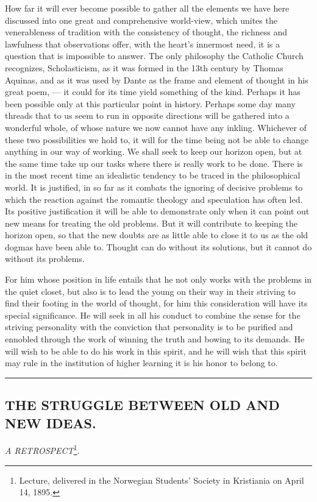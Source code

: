 \documentclass[12pt,a4paper,openany]{book}
\newcommand{\opage}[1]{\marginnote{\footnotesize\textit{[#1]}}}
\newcommand{\essay}[2][]{\chapter*{#2}\addcontentsline{toc}{chapter}{#1}}
\newcommand{\streg}{\begin{center}\rule{3em}{0.4pt}\end{center}}
\begin{document}
How far it will ever become possible to gather all
the elements we have here discussed into one great and comprehensive
world-view, which unites the venerableness of tradition
with the consistency of thought, the richness and lawfulness
that observations offer, with the heart's innermost need, it is
a question that is impossible to answer. The only
philosophy the Catholic Church recognizes, Scholasticism, as it
was formed in the 13th century by Thomas Aquinas, and as it
was used by Dante as the frame and element of thought in his
great poem, --- it could for its time yield something of the kind.
Perhaps it has been possible only at this particular point
in history. Perhaps some day many threads that to us
seem to run in opposite directions will be gathered into a wonderful whole,
of whose nature we now cannot have any inkling. Whichever
of these two possibilities we hold to, it will for the time being
not be able to change anything in our way of working. We shall seek to
keep our horizon open, but at the same time take up our tasks
where there is really work to be done. There is in the
most recent time an idealistic tendency to be traced in the philosophical
world. It is justified, in so far as it combats the
ignoring of decisive problems to which the reaction against the
romantic theology and speculation has often led. Its
positive justification it will be able to demonstrate only when it
\opage{224}can point out new means for treating the old problems.
But it will contribute to keeping the horizon open, so that the
new doubts are as little able to close it to us as the
old dogmas have been able to. Thought can do without its
solutions, but it cannot do without its problems.

For him whose position in life entails that he not only
works with the problems in the quiet closet, but also
is to lead the young on their way in their striving to find
their footing in the world of thought, for him this consideration
will have its special significance. He will seek in all his conduct to
combine the sense for the striving personality with
the conviction that personality is to be purified and ennobled through
the work of winning the truth and bowing to its demands.
He will wish to be able to do his work in this spirit, and
he will wish that this spirit may rule in the institution of higher learning
it is his honor to belong to.

\streg{}

\opage{225}
\begin{center}

\essay[The Struggle between Old and New Ideas]{THE STRUGGLE BETWEEN OLD AND NEW IDEAS.}

\emph{A RETROSPECT}\footnote{Lecture, delivered in the Norwegian Students' Society in Kristiania on April 14,
1895.}.\end{center}
\end{document}
